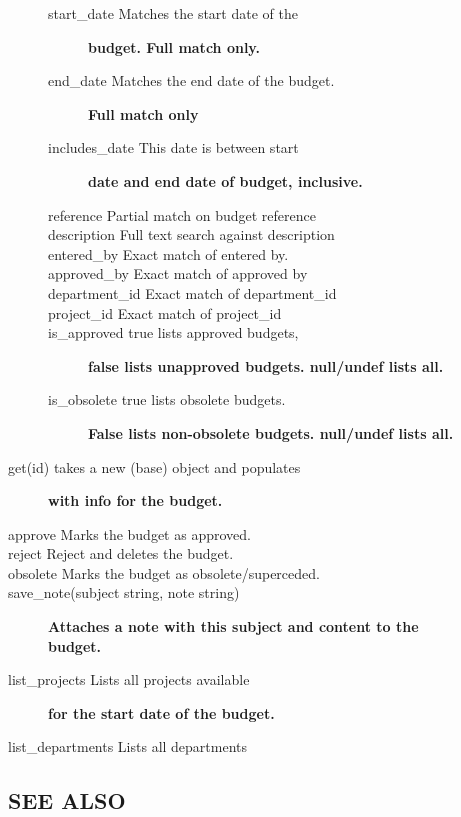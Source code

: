 \begin{description}
\begin{description}
\begin{description}
\item[{start\_date Matches the start date of the}] \textbf{budget. Full match only.}
\item[{end\_date Matches the end date of the budget.}] \textbf{Full match only}
\item[{includes\_date This date is between start}] \textbf{date and end date of budget, inclusive.}
\item[{reference Partial match on budget reference}] \mbox{}
\item[{description Full text search against description}] \mbox{}
\item[{entered\_by
Exact match of entered by.}] \mbox{}
\item[{approved\_by
Exact match of approved by}] \mbox{}
\item[{department\_id Exact match of department\_id}] \mbox{}
\item[{project\_id
Exact match of project\_id}] \mbox{}
\item[{is\_approved true lists approved budgets,}] \textbf{false lists unapproved budgets. null/undef lists all.}
\item[{is\_obsolete true lists obsolete budgets.}] \textbf{False lists non-obsolete budgets. null/undef lists all.}\end{description}

\item[{get(id) takes a new (base) object and populates}] \textbf{with info for the budget.}
\item[{approve
Marks the budget as approved.}] \mbox{}
\item[{reject
Reject and deletes the budget.}] \mbox{}
\item[{obsolete Marks the budget as obsolete/superceded.}] \mbox{}
\item[{save\_note(subject string, note string)}] \textbf{Attaches a note with this subject and content to the budget.}
\item[{list\_projects Lists all projects available}] \textbf{for the start date of the budget.}
\item[{list\_departments
Lists all departments}] \mbox{}\end{description}
\subsection*{SEE ALSO\label{LedgerSMB::DBObject::Budget_SEE_ALSO}}
\begin{description}


\end{description}
\end{description}

